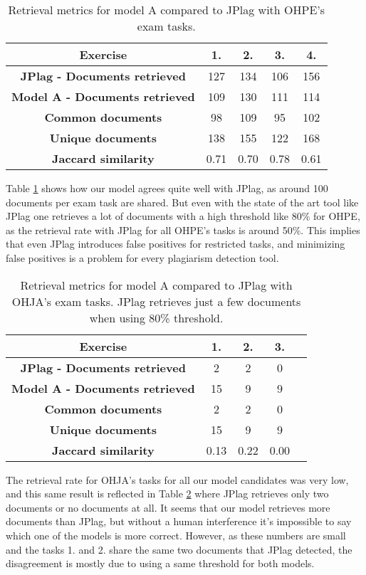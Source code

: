 \begin{table}[ht]
\centering
\caption{Retrieval metrics for model A compared to JPlag with OHPE's exam tasks.}
\begin{tabular}{|c||c|c|c|c|}
\hline
\bf Exercise & 1. & 2. & 3. & 4. \\ \hline
\bf JPlag - Documents retrieved & 127 & 134 & 106 & 156 \\ \hline
\bf Model A - Documents retrieved & 109 & 130 & 111 & 114\\ \hline
\bf Common documents & 98  & 109 & 95 & 102\\ \hline
\bf Unique documents & 138 & 155 & 122 & 168\\ \hline
\bf Jaccard similarity    & 0.71  & 0.70  & 0.78  & 0.61  \\ \hline
\end{tabular}
\label{tbl-jacc-sd-ohpe}
\end{table}

\noindent
Table \ref{tbl-jacc-sd-ohpe} shows how our model agrees quite well with JPlag, as around 100 documents per exam task are shared. But even with the state of the art tool like JPlag one retrieves a lot of documents with a high threshold like 80\% for OHPE, as the retrieval rate with JPlag for all OHPE's tasks is around 50\%. This implies that even JPlag introduces false positives for restricted tasks, and minimizing false positives is a problem for every plagiarism detection tool.   

\begin{table}[ht]
\centering
\caption{Retrieval metrics for model A compared to JPlag with OHJA's exam tasks. JPlag retrieves just a few documents when using 80\% threshold.}
\begin{tabular}{|c||c|c|c|c|}
\hline
\bf Exercise & 1. & 2. & 3. \\ \hline
\bf JPlag - Documents retrieved & 2 & 2 & 0  \\ \hline
\bf Model A - Documents retrieved & 15 & 9 & 9 \\ \hline
\bf Common documents & 2  & 2 & 0\\ \hline
\bf Unique documents & 15 & 9 & 9\\ \hline
\bf Jaccard similarity    & 0.13  & 0.22  & 0.00  \\ \hline
\end{tabular}
\label{tbl-jacc-sd-ohja}
\end{table}

\noindent
The retrieval rate for OHJA's tasks for all our model candidates was very low, and this same result is reflected in Table \ref{tbl-jacc-sd-ohja} where JPlag retrieves only two documents or no documents at all. It seems that our model retrieves more documents than JPlag, but without a human interference it's impossible to say which one of the models is more correct. However, as these numbers are small and the tasks 1. and 2. share the same two documents that JPlag detected, the disagreement is mostly due to using a same threshold for both models.

